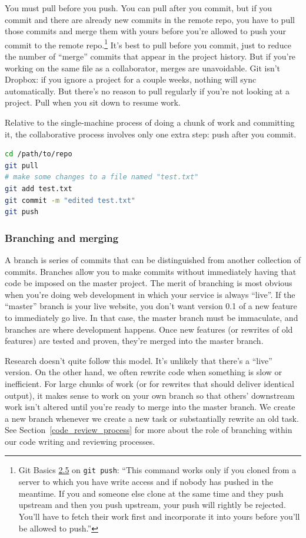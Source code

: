 You must pull before you push.
You can pull after you commit, but if you commit and there are already new commits in the remote repo, you have to pull those commits and merge them with yours before you're allowed to push your commit to the remote repo.\footnote{
	Git Basics \href{https://git-scm.com/book/en/v2/Git-Basics-Working-with-Remotes\#_pushing_remotes}{2.5} on \texttt{git push}: ``This command works only if you cloned from a server to which you have write access and if nobody has pushed in the meantime. If you and someone else clone at the same time and they push upstream and then you push upstream, your push will rightly be rejected. You'll have to fetch their work first and incorporate it into yours before you'll be allowed to push.''
}
It's best to pull before you commit, just to reduce the number of ``merge'' commits that appear in the project history.
But if you're working on the same file as a collaborator, merges are unavoidable.
Git isn't Dropbox: if you ignore a project for a couple weeks, nothing will sync automatically.
But there's no reason to pull regularly if you're not looking at a project.
Pull when you sit down to resume work.

Relative to the single-machine process of doing a chunk of work and committing it,
the collaborative process involves only one extra step:
push after you commit.
\begin{lstlisting}[language=bash]
cd /path/to/repo
git pull
# make some changes to a file named "test.txt"
git add test.txt
git commit -m "edited test.txt"
git push
\end{lstlisting}


\subsubsection{Branching and merging}
A branch is series of commits that can be distinguished from another collection of commits.
Branches allow you to make commits without immediately having that code be imposed on the master project.
The merit of branching is most obvious when you're doing web development in which your service is always ``live''.
If the ``master'' branch is your live website, you don't want version 0.1 of a new feature to immediately go live.
In that case, the master branch must be immaculate, and branches are where development happens.
Once new features (or rewrites of old features) are tested and proven, they're merged into the master branch.

Research doesn't quite follow this model.
It's unlikely that there's a ``live'' version.
On the other hand, we often rewrite code when something is slow or inefficient.
For large chunks of work (or for rewrites that should deliver identical output), it makes sense to work on your own branch so that others' downstream work isn't altered until you're ready to merge into the master branch.
We create a new branch whenever we create a new task or substantially rewrite an old task.
See Section~\ref{code_review_process} for more about the role of branching within our code writing and reviewing processes.


